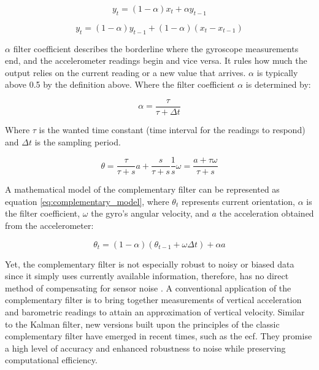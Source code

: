 \begin{equation}
    y_t = (1-\alpha)x_{t} + \alpha y_{t-1}
    \label{eq:low_pass_filter}
\end{equation}

\begin{equation}
    y_t = (1-\alpha)y_{t-1} + (1-\alpha) (x_t - x_{t-1})
    \label{eq:high_pass_filter}
\end{equation}

$\alpha$ filter coefficient describes the borderline where the gyroscope measurements end, and the accelerometer readings begin and vice versa. It rules how much the output relies on the current reading or a new value that arrives. $\alpha$ is typically above 0.5 by the definition above. Where the filter coefficient $\alpha$ is determined by:

\begin{equation}
    \alpha = \frac{\tau}{\tau + \Delta t}
\end{equation}

Where $\tau$ is the wanted time constant (time interval for the readings to respond) and $\Delta t$ is the sampling period.

\begin{equation}
    \theta = \frac{\tau}{\tau + s}a + \frac{s}{\tau + s}\frac{1}{s}\omega = \frac{a+\tau \omega}{\tau + s}
\end{equation}

A mathematical model of the complementary filter can be represented as equation \ref{eq:complementary_model}, where $\theta_t$ represents current orientation, $\alpha$ is the filter coefficient, $\omega$ the gyro's angular velocity, and $a$ the acceleration obtained from the accelerometer:

\begin{equation}
    \theta_t = (1 - \alpha) (\theta_{t-1} + \omega \Delta t) + \alpha a
    \label{eq:complementary_model}
\end{equation}

Yet, the complementary filter is not especially robust to noisy or biased data since it simply uses currently available information, therefore, has no direct method of compensating for sensor noise \cite{wilson2019formulation}. A conventional application of the complementary filter is to bring together measurements of vertical acceleration and barometric readings to attain an approximation of vertical velocity. Similar to the Kalman filter, new versions built upon the principles of the classic complementary filter have emerged in recent times, such as the \acrfull{ecf}. They promise a high level of accuracy and enhanced robustness to noise while preserving computational efficiency.


